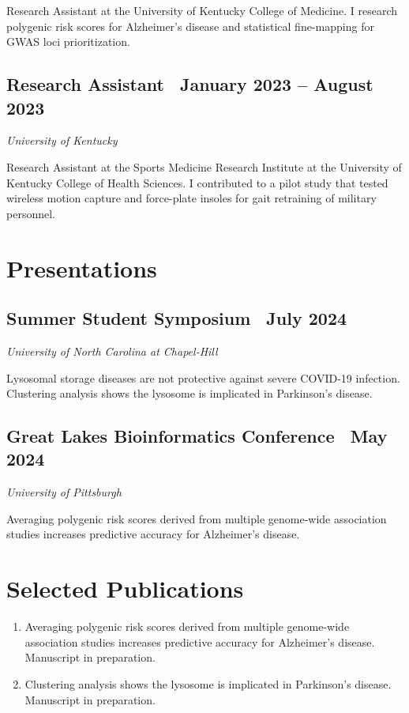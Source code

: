 \documentclass{article}
\begin{document}
\begin{flushleft}
Research Assistant at the University of Kentucky College of Medicine. I research polygenic risk scores for 
Alzheimer's disease and statistical fine-mapping for GWAS loci prioritization.

\subsection*{Research Assistant {\hfill\normalsize\normalfont\ January 2023 -- August 2023}}
\textit{University of Kentucky \vspace{0.5em}}

Research Assistant at the Sports Medicine Research Institute at the University of Kentucky College of Health Sciences. 
I contributed to a pilot study that tested wireless motion capture and force-plate insoles for gait retraining of military
personnel. 

\section*{Presentations}
\subsection*{Summer Student Symposium {\hfill\normalsize\normalfont\ July 2024}}
\textit{University of North Carolina at Chapel-Hill}

Lysosomal storage diseases are not protective against severe COVID-19 infection. Clustering analysis shows the lysosome is implicated in Parkinson's disease.

\subsection*{Great Lakes Bioinformatics Conference {\hfill\normalsize\normalfont\ May 2024}}
\textit{University of Pittsburgh \vspace{0.5em}}

Averaging polygenic risk scores derived from multiple genome-wide association studies increases predictive accuracy for Alzheimer’s disease.

\section*{Selected Publications}
\begin{enumerate}
\item Averaging polygenic risk scores derived from multiple genome-wide association studies increases predictive accuracy for Alzheimer’s disease. Manuscript in preparation.
\item Clustering analysis shows the lysosome is implicated in Parkinson's disease. Manuscript in preparation.
\end{enumerate}


\end{flushleft}
\end{document}
